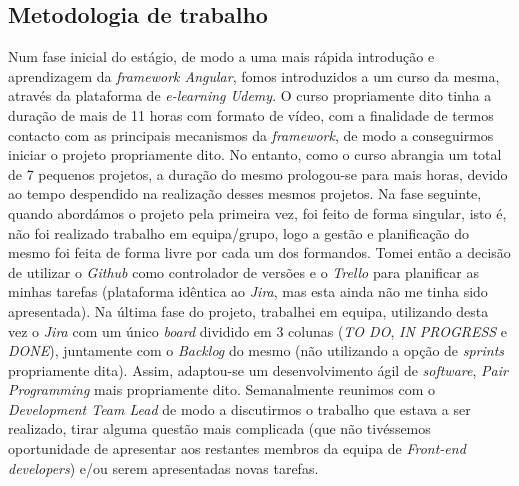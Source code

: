 \documentclass{article}
\begin{document}
\subsection{Metodologia de trabalho}
\hspace*{0.5cm} Num fase inicial do estágio, de modo a uma mais rápida introdução e aprendizagem da \emph{framework Angular}, fomos introduzidos a um curso da mesma, através da plataforma de \emph{e-learning Udemy}. O curso propriamente dito tinha a duração de mais de 11 horas com formato de vídeo, com a finalidade de termos contacto com as principais mecanismos da \emph{framework}, de modo a conseguirmos iniciar o projeto propriamente dito. No entanto, como o curso abrangia um total de 7 pequenos projetos, a duração do mesmo prologou-se para mais horas, devido ao tempo despendido na realização desses mesmos projetos. \newline
\hspace*{0.5cm} Na fase seguinte, quando abordámos o projeto pela primeira vez, foi feito de forma singular, isto é, não foi realizado trabalho em equipa/grupo, logo a gestão e planificação do mesmo foi feita de forma livre por cada um dos formandos. Tomei então a decisão de utilizar o \emph{Github} como controlador de versões e o \emph{Trello} para planificar as minhas tarefas (plataforma idêntica ao \emph{Jira}, mas esta ainda não me tinha sido apresentada). \newline
\hspace*{0.5cm} Na última fase do projeto, trabalhei em equipa, utilizando desta vez o \emph{Jira} com um único \emph{board} dividido em 3 colunas (\emph{TO DO}, \emph{IN PROGRESS} e \emph{DONE}), juntamente com o \emph{Backlog} do mesmo (não utilizando a opção de \emph{sprints} propriamente dita). Assim, adaptou-se um desenvolvimento ágil de \emph{software}, \emph{Pair Programming} mais propriamente dito. \newline
\hspace*{0.5cm} Semanalmente reunimos com o \emph{Development Team Lead} de modo a discutirmos o trabalho que estava a ser realizado, tirar alguma questão mais complicada (que não tivéssemos oportunidade de apresentar aos restantes membros da equipa de \emph{Front-end developers}) e/ou serem apresentadas novas tarefas. \newline

\cleardoublepage
\end{document}
